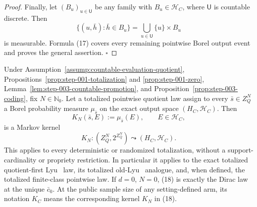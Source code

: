 \begin{proof}
Finally, let \((B_u)_{u\in\mathsf U}\) be any family with
\(B_u\in\mathcal H_C\), where \(\mathsf U\) is countable discrete. Then
\[
\{(u,\bar h):\bar h\in B_u\}
=\bigcup_{u\in\mathsf U}\{u\}\times B_u
\tag{17}
\]
is measurable. Formula (17) covers every remaining pointwise Borel output
event and proves the general assertion. \(\square\)


\end{proof}

\begin{proposition}\label{prop:step-003-quotient-kernel}
Under Assumption~\ref{assump:countable-evaluation-quotient}, 
Propositions~\ref{prop:step-001-totalization} and
\ref{prop:step-001-zero},
Lemma~\ref{lem:step-003-countable-promotion}, and
Proposition~\ref{prop:step-003-coding}, fix
\(N\in\mathbb N_0\). Let a totalized pointwise quotient law assign to every
\(\bar s\in Z_Q^N\) a Borel probability measure
\(\mu_{\bar s}\) on the exact output space \((H_C,\mathcal H_C)\). Then
\[
K_N(\bar s,E):=\mu_{\bar s}(E),
\qquad E\in\mathcal H_C,
\tag{18}
\]
is a Markov kernel
\[
K_N:(Z_Q^N,2^{Z_Q^N})\leadsto(H_C,\mathcal H_C).
\tag{19}
\]
This applies to every deterministic or randomized totalization, without a
support-cardinality or propriety restriction. In particular it applies to
the exact totalized quotient-first Lyu~\citep{lyu2025} law, its totalized old-Lyu~\citep{lyu2025} analogue,
and, when defined, the totalized finite-class pointwise law. If \(d=0\),
\(N=0\), (18) is exactly the Dirac law at the unique \(\bar c_0\).
At the public sample size of any setting-defined arm, its notation \(K_C\)
means the corresponding kernel \(K_N\) in (18).


\end{proposition}

